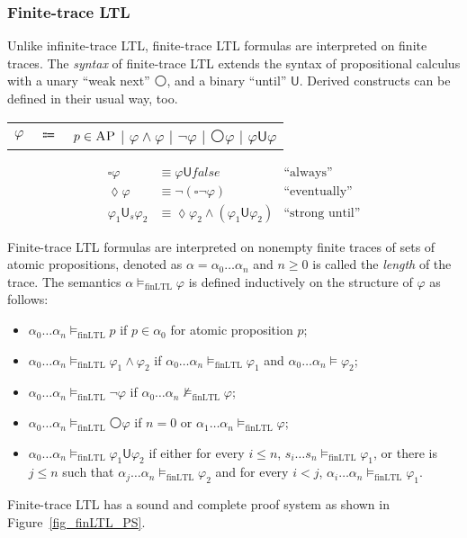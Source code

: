 \documentclass[acmsmall]{acmart}
\newcommand{\AP}{\textsc{AP}}
\newcommand{\false}{\mathit{false}}
\newcommand{\wnext}{{\medcirc}}
\newcommand{\always}{{\square}}
\newcommand{\eventually}{{\lozenge}}
\newcommand{\UU}{\mathbin{\mathsf{U}}}
\newcommand{\Us}{\mathbin{\mathsf{U}_s}}
\newcommand{\finLTL}{\mathrm{finLTL}}
\begin{document}
\subsubsection{Finite-trace LTL}
Unlike infinite-trace LTL, finite-trace LTL formulas
are interpreted on finite traces.
The \emph{syntax} of finite-trace LTL extends the syntax of
propositional calculus with
a unary ``weak next'' $\wnext$,
and a binary ``until'' $\UU$. Derived constructs can be defined
in their usual way, too.
\begin{center}
\begin{tabular}{crl}
$\varphi$ & $\Coloneqq$ & $p \in \AP$
          $|$ $\varphi \wedge \varphi$
          $|$ $\neg \varphi$
          $|$ $\wnext \varphi$
          $|$ $\varphi \UU \varphi$
\end{tabular}
\begin{align*}
\always \varphi &\equiv \varphi \UU \false
& \text{``always''}
\\
\eventually \varphi &\equiv \neg (\always \neg \varphi)
& \text{``eventually''}
\\
\varphi_1 \Us \varphi_2 &\equiv 
\eventually \varphi_2 \wedge (\varphi_1 \UU \varphi_2)
& \text{``strong until''}
\end{align*}
\end{center}
Finite-trace LTL formulas are interpreted on nonempty finite traces
of sets of atomic propositions, denoted as
$\alpha = \alpha_0 \dots \alpha_n$
and $n \ge 0$ is called the \emph{length} of the trace.
The semantics $\alpha \vDash_\finLTL \varphi$ is defined
inductively on the structure of $\varphi$ as follows:
\begin{itemize}
\item $\alpha_0 \dots \alpha_n 
       \vDash_\finLTL p$ if $p \in \alpha_0$ for atomic proposition $p$;
\item $\alpha_0 \dots \alpha_n  \vDash_\finLTL \varphi_1 \wedge \varphi_2$
      if $\alpha_0 \dots \alpha_n  \vDash_\finLTL \varphi_1$ and 
      $\alpha_0 \dots \alpha_n  \vDash \varphi_2$;
\item $\alpha_0 \dots \alpha_n  \vDash_\finLTL \neg \varphi$
      if $\alpha_0 \dots \alpha_n  \not\vDash_\finLTL \varphi$;
\item $\alpha_0 \dots \alpha_n \vDash_\finLTL \wnext \varphi$
      if $n = 0$ or $\alpha_1 \dots \alpha_n \vDash_\finLTL \varphi$;
\item $\alpha_0 \dots \alpha_n \vDash_\finLTL \varphi_1 \UU \varphi_2$
      if either for every $i \le n$,
      $s_i \dots s_n \vDash_\finLTL \varphi_1$,
      or there is $j \le n$ such that
      $\alpha_j \dots \alpha_n \vDash_\finLTL \varphi_2$ and for every $i < j$,
      $\alpha_i \dots \alpha_n \vDash_\finLTL \varphi_1$.
\end{itemize}
Finite-trace LTL has a sound and complete proof system
as shown in Figure~\ref{fig_finLTL_PS}.
\end{document}
